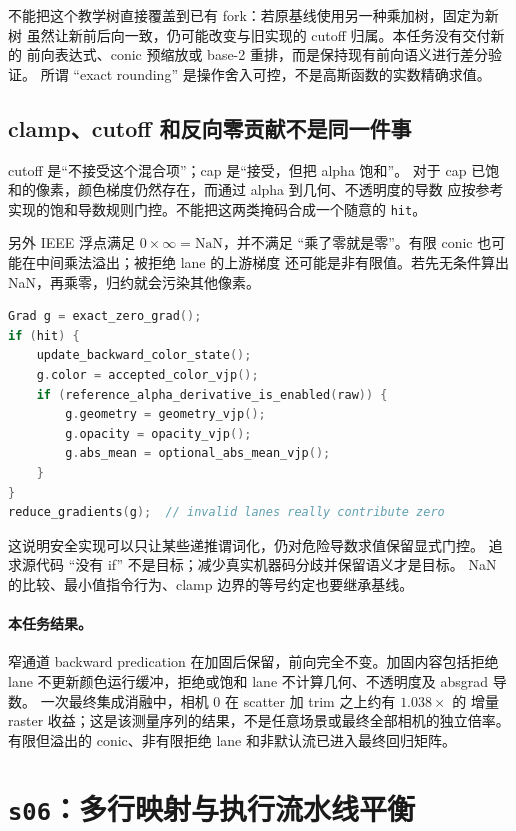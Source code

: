 不能把这个教学树直接覆盖到已有 fork：若原基线使用另一种乘加树，固定为新树
虽然让新前后向一致，仍可能改变与旧实现的 cutoff 归属。本任务没有交付新的
前向表达式、conic 预缩放或 base-2 重排，而是保持现有前向语义进行差分验证。
所谓 ``exact rounding'' 是操作舍入可控，不是高斯函数的实数精确求值。

\subsection{clamp、cutoff 和反向零贡献不是同一件事}

cutoff 是``不接受这个混合项''；cap 是``接受，但把 alpha 饱和''。
对于 cap 已饱和的像素，颜色梯度仍然存在，而通过 alpha 到几何、不透明度的导数
应按参考实现的饱和导数规则门控。不能把这两类掩码合成一个随意的 \texttt{hit}。

另外 IEEE 浮点满足 $0\times\infty=\mathrm{NaN}$，并不满足
``乘了零就是零''。有限 conic 也可能在中间乘法溢出；被拒绝 lane 的上游梯度
还可能是非有限值。若先无条件算出 NaN，再乘零，归约就会污染其他像素。

\begin{lstlisting}[language=C++,basicstyle=\ttfamily\small,breaklines=true]
Grad g = exact_zero_grad();
if (hit) {
    update_backward_color_state();
    g.color = accepted_color_vjp();
    if (reference_alpha_derivative_is_enabled(raw)) {
        g.geometry = geometry_vjp();
        g.opacity = opacity_vjp();
        g.abs_mean = optional_abs_mean_vjp();
    }
}
reduce_gradients(g);  // invalid lanes really contribute zero
\end{lstlisting}

这说明安全实现可以只让某些递推谓词化，仍对危险导数求值保留显式门控。
追求源代码 ``没有 if'' 不是目标；减少真实机器码分歧并保留语义才是目标。
NaN 的比较、最小值指令行为、clamp 边界的等号约定也要继承基线。

\paragraph{本任务结果。}
窄通道 backward predication 在加固后保留，前向完全不变。加固内容包括拒绝 lane
不更新颜色运行缓冲，拒绝或饱和 lane 不计算几何、不透明度及 absgrad 导数。
一次最终集成消融中，相机 0 在 scatter 加 trim 之上约有 $1.038\times$ 的
增量 raster 收益；这是该测量序列的结果，不是任意场景或最终全部相机的独立倍率。
有限但溢出的 conic、非有限拒绝 lane 和非默认流已进入最终回归矩阵。

\section{\texttt{s06}：多行映射与执行流水线平衡}

